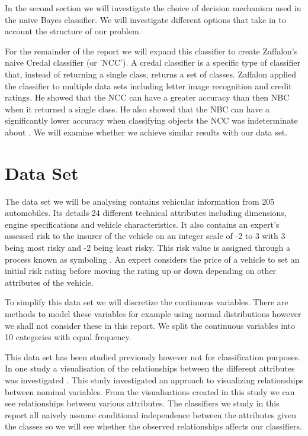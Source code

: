 In the second section we will investigate the choice of decision mechanism used in the naive Bayes classifier.
We will investigate different options that take in to account the structure of our problem.

For the remainder of the report we will expand this classifier to create Zaffalon's \cite{Zaffalon01} naive Credal classifier (or 'NCC').
A credal classifier is a specific type of classifier that, instead of returning a single class, returns a set of classes.
Zaffalon applied the classifier to multiple data sets including letter image recognition and credit ratings.
He showed that the NCC can have a greater accuracy than then NBC when it returned a single class.
He also showed that the NBC can have a significantly lower accuracy when classifying objects the NCC was indeterminate about \cite{Zaffalon01}.
We will examine whether we achieve similar results with our data set.

\section{Data Set}

The data set we will be analysing contains vehicular information from 205 automobiles.
Its details 24 different technical attributes including dimensions, engine specifications and vehicle characteristics.
It also contains an expert's assessed risk to the insurer of the vehicle on an integer scale of -2 to 3 with 3 being most risky and -2 being least risky.
This risk value is assigned through a process known as symboling \cite{Automobile}.
An expert considers the price of a vehicle to set an initial risk rating before moving the rating up or down depending on other attributes of the vehicle.

To simplify this data set we will discretize the continuous variables.
There are methods to model these variables for example using normal distributions \cite{Dumitru09} however we shall not consider these in this report.
We split the continuous variables into 10 categories with equal frequency.

This data set has been studied previously however not for classification purposes.
In one study a visualisation of the relationships between the different attributes was investigated \cite{Rosario04}.
This study investigated an approach to visualizing relationships between nominal variables.
From the visualisations created in this study we can see relationships between various attributes.
The classifiers we study in this report all naively assume conditional independence between the attributes given the classes so we will see whether the observed relationships affects our classifiers.